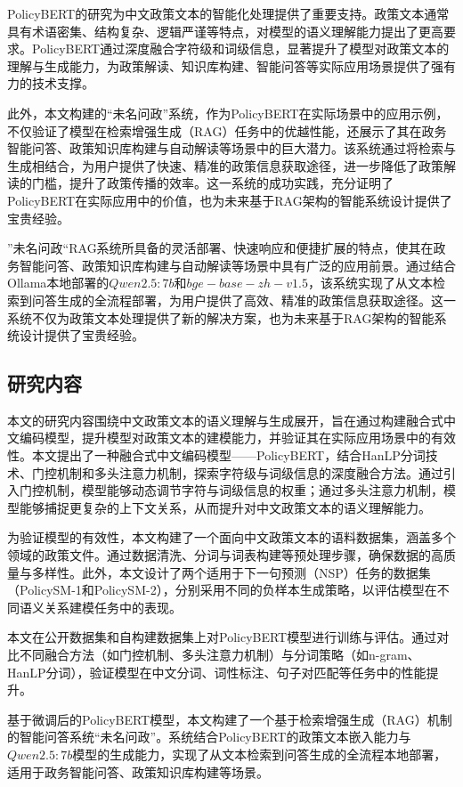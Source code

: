 \documentclass[12pt, a4paper]{ctexart}
\begin{document}
PolicyBERT的研究为中文政策文本的智能化处理提供了重要支持。政策文本通常具有术语密集、结构复杂、逻辑严谨等特点，对模型的语义理解能力提出了更高要求。PolicyBERT通过深度融合字符级和词级信息，显著提升了模型对政策文本的理解与生成能力，为政策解读、知识库构建、智能问答等实际应用场景提供了强有力的技术支撑。

此外，本文构建的“未名问政”系统，作为PolicyBERT在实际场景中的应用示例，不仅验证了模型在检索增强生成（RAG）任务中的优越性能，还展示了其在政务智能问答、政策知识库构建与自动解读等场景中的巨大潜力。该系统通过将检索与生成相结合，为用户提供了快速、精准的政策信息获取途径，进一步降低了政策解读的门槛，提升了政策传播的效率。这一系统的成功实践，充分证明了PolicyBERT在实际应用中的价值，也为未来基于RAG架构的智能系统设计提供了宝贵经验。

”未名问政“RAG系统所具备的灵活部署、快速响应和便捷扩展的特点，使其在政务智能问答、政策知识库构建与自动解读等场景中具有广泛的应用前景。通过结合Ollama本地部署的$Qwen2.5:7b$和$ bge-base-zh-v1.5 $，该系统实现了从文本检索到问答生成的全流程部署，为用户提供了高效、精准的政策信息获取途径。这一系统不仅为政策文本处理提供了新的解决方案，也为未来基于RAG架构的智能系统设计提供了宝贵经验。


\subsection{研究内容}

本文的研究内容围绕中文政策文本的语义理解与生成展开，旨在通过构建融合式中文编码模型，提升模型对政策文本的建模能力，并验证其在实际应用场景中的有效性。本文提出了一种融合式中文编码模型——PolicyBERT，结合HanLP分词技术、门控机制和多头注意力机制，探索字符级与词级信息的深度融合方法。通过引入门控机制，模型能够动态调节字符与词级信息的权重；通过多头注意力机制，模型能够捕捉更复杂的上下文关系，从而提升对中文政策文本的语义理解能力。

为验证模型的有效性，本文构建了一个面向中文政策文本的语料数据集，涵盖多个领域的政策文件。通过数据清洗、分词与词表构建等预处理步骤，确保数据的高质量与多样性。此外，本文设计了两个适用于下一句预测（NSP）任务的数据集（PolicySM-1和PolicySM-2），分别采用不同的负样本生成策略，以评估模型在不同语义关系建模任务中的表现。

本文在公开数据集和自构建数据集上对PolicyBERT模型进行训练与评估。通过对比不同融合方法（如门控机制、多头注意力机制）与分词策略（如n-gram、HanLP分词），验证模型在中文分词、词性标注、句子对匹配等任务中的性能提升。

基于微调后的PolicyBERT模型，本文构建了一个基于检索增强生成（RAG）机制的智能问答系统“未名问政”。系统结合PolicyBERT的政策文本嵌入能力与$Qwen2.5:7b$模型的生成能力，实现了从文本检索到问答生成的全流程本地部署，适用于政务智能问答、政策知识库构建等场景。
\end{document}
